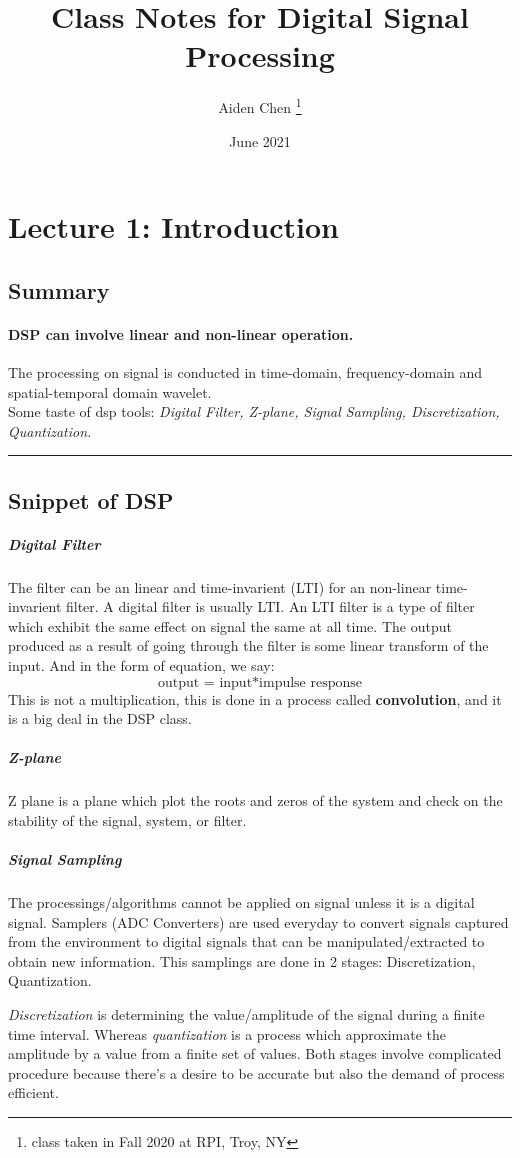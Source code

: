 \documentclass[12pt, letterpaper]{article}
\title{Class Notes for Digital Signal Processing}
\author{Aiden Chen \thanks{class taken in Fall 2020 at RPI, Troy, NY}}
\date{June 2021}
\begin{document}
\begin{titlepage}
    \maketitle
\end{titlepage}

\section*{Lecture 1: Introduction}
\subsection*{Summary}
\paragraph{DSP can involve linear and non-linear operation.}
The processing on signal is conducted in time-domain, frequency-domain and spatial-temporal domain wavelet. \\Some taste of dsp tools: \textit{Digital Filter, Z-plane, Signal Sampling, Discretization, Quantization.}
\vspace{5pt}
\hrule
\subsection*{Snippet of DSP}
\subparagraph*{Digital Filter}
The filter can be an linear and time-invarient (LTI) for an non-linear time-invarient filter. A digital filter is usually LTI. An LTI filter is a type of filter which exhibit the same effect on signal the same at all time.
The output  produced as a result of going through the filter is some linear transform of the input. And in the form of equation, we say:
$$\text{output = input} \ast \text{impulse response}$$
This is not a multiplication, this is done in a process called \textbf{convolution}, and it is a big deal in the DSP class.
\subparagraph*{Z-plane}
Z plane is a plane which plot the roots and zeros of the system and check on the stability of the signal, system, or filter.
\subparagraph*{Signal Sampling}
The processings/algorithms cannot be applied on signal unless it is a digital signal. Samplers (ADC Converters) are used everyday to convert signals captured from the environment to digital signals that can be manipulated/extracted to obtain new information. This samplings are done in 2 stages: Discretization, Quantization.

\textit{Discretization} is determining the value/amplitude of the signal during a finite time interval. Whereas \textit{quantization} is a process which approximate the amplitude by a value from a finite set of values. Both stages involve complicated procedure because there's a desire to be accurate but also the demand of process efficient.
\end{document}
